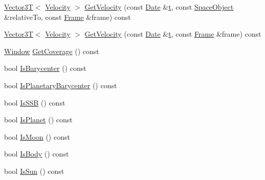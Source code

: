\begin{DoxyCompactItemize}
\item 
\hyperlink{class_vector3_t}{Vector3\+T}$<$ \hyperlink{_quantity_8h_a97d9cd61ce134def151c1ed0867b0708}{Velocity} $>$ \hyperlink{class_space_object_ac12ce6edf54d7e93c33aa8a1854d5f82}{Get\+Velocity} (const \hyperlink{class_date}{Date} \&\hyperlink{glext_8h_a7d65d00ca3b0630d9b5c52df855b19f5}{t}, const \hyperlink{class_space_object}{Space\+Object} \&relative\+To, const \hyperlink{class_frame}{Frame} \&frame) const 
\item 
\hyperlink{class_vector3_t}{Vector3\+T}$<$ \hyperlink{_quantity_8h_a97d9cd61ce134def151c1ed0867b0708}{Velocity} $>$ \hyperlink{class_space_object_acb8dc5b6d00e516c7eda3e05cc5f213d}{Get\+Velocity} (const \hyperlink{class_date}{Date} \&\hyperlink{glext_8h_a7d65d00ca3b0630d9b5c52df855b19f5}{t}, const \hyperlink{class_frame}{Frame} \&frame) const 
\item 
\hyperlink{class_window}{Window} \hyperlink{class_space_object_a8917a1ebbe125c0a40e857ba6cbca6a3}{Get\+Coverage} () const 
\item 
bool \hyperlink{class_space_object_ac28320427a47945f5a3f55d2d6782ac7}{Is\+Barycenter} () const 
\item 
bool \hyperlink{class_space_object_aee6e2b434bf3b775813c26dfedbf0d8b}{Is\+Planetary\+Barycenter} () const 
\item 
bool \hyperlink{class_space_object_af60d3e96d0d246d9efe821d453472222}{Is\+S\+S\+B} () const 
\item 
bool \hyperlink{class_space_object_a9983084aeef5b66ad1867a11af3f6d78}{Is\+Planet} () const 
\item 
bool \hyperlink{class_space_object_af412b21c3066595a80169d413ec8777a}{Is\+Moon} () const 
\item 
bool \hyperlink{class_space_object_ac8010baf561aced8e70fb2fb66a47171}{Is\+Body} () const 
\item 
bool \hyperlink{class_space_object_adf3b4cb454468d8cc3d467c0fe799dcd}{Is\+Sun} () const 
\end{DoxyCompactItemize}
